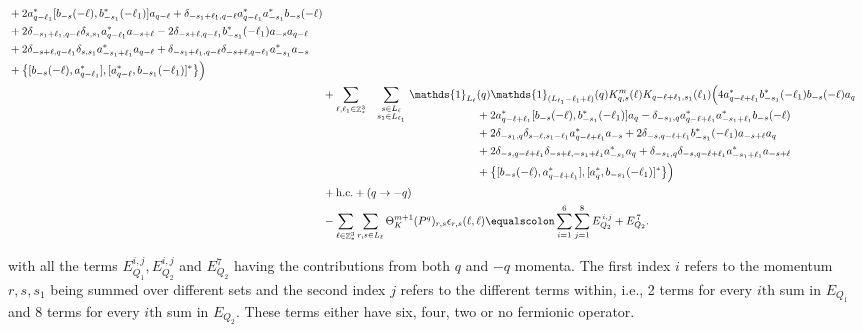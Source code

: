 \documentclass[sn-mathphys, Numbered ,a4paper]{sn-jnl}%
\DeclareMathOperator{\Z}{\mathbb{Z}}
\theoremstyle{plain}
\theoremstyle{definition}
\theoremstyle{remark}
\theoremstyle{plain}
\theoremstyle{definition}
\theoremstyle{remark}
\begin{document}
\begin{alignat}{2}
\begin{aligned}[t]
		&+ 2a^*_{q-\ell_1}[b_{-s}(-\ell),b^*_{-s_1}(-\ell_1)]a_{q-\ell}+\delta_{-s_1+\ell_1,q-\ell} a^*_{q-\ell_1}a^*_{-s_1}b_{-s}(-\ell)\nonumber\\
		&+ 2\delta_{-s_1+\ell_1,q-\ell}\delta_{s,s_1}a^*_{q-\ell_1}a_{-s+\ell} - 2\delta_{-s+\ell,q-\ell_1}b^*_{-s_1}(-\ell_1)a_{-s}a_{q-\ell} \nonumber\\
		&+2\delta_{-s+\ell,q-\ell_1}\delta_{s,s_1}a^*_{-s_1+\ell_1} a_{q-\ell} + \delta_{-s_1+\ell_1,q-\ell}\delta_{-s+\ell,q-\ell_1}a^*_{-s_1}a_{-s} \nonumber\\
		&+ \big\{ [b_{-s}(-\ell),a^*_{q-\ell_1}],[a^*_{q-\ell}, b_{-s_1}(-\ell_1)]^*\big\} \Big) 
	\end{aligned}\nonumber\\
	&+\sum\limits_{\ell, \ell_1\in \Z^3_*}\!\quad\sum\limits_{\substack{s \in L_{\ell}\\     s_1 \in L_{\ell_1}}} \begin{aligned}[t]\, \mathds{1}_{L_\ell}&       (q) \mathds{1}_{(L_{\ell_1}-\ell_1+\ell)}(q) K^{m}_{q,s}(\ell) K_{q-\ell+\ell_1,s_1}        (\ell_1) \Big(4a^*_{q-\ell+\ell_1}b^*_{-s_1}(-\ell_1)b_{-s}(-\ell)a_{q}       \nonumber\\ 
		&+ 2a^*_{q-\ell+\ell_1}[b_{-s}(-\ell),b^*_{-s_1}(-\ell_1)]a_{q}- \delta_{-s_1, q}a^*_{q-\ell+\ell_1}a^*_{-s_1+\ell_1}b_{-s}(-\ell) \nonumber\\
		&+ 2\delta_{-s_1,q}\delta_{s-\ell,s_1-\ell_1}a^*_{q-\ell+\ell_1}a_{-s} + 2\delta_{-s,q-\ell+\ell_1}b^*_{-s_1}(-\ell_1)a_{-s+\ell}a_{q} \nonumber\\
		&+2\delta_{-s,q-\ell+\ell_1}\delta_{-s+\ell,-s_1+\ell_1}a^*_{-s_1}a_{q} + \delta_{-s_1,q}\delta_{-s,q-\ell+\ell_1}a^*_{-s_1+\ell_1}a_{-s+\ell} \nonumber\\
		&+ \big\{ [b_{-s}(-\ell),a^*_{q-\ell+\ell_1}],[a^*_{q}, b_{-s_1}(-\ell_1)]^*\big\} \Big)
	\end{aligned}\nonumber\\
	&+\mathrm{h.c.} + (q\rightarrow-q)\nonumber\\
	&-\sum\limits_{\ell \in \Z^3_*}\sum\limits_{r,s \in L_{\ell}}\Theta^{m+1}_K(P^q)_{r,s}\epsilon_{r,s}(\ell,\ell)
	\equalscolon \sum\limits_{i=1}^{6}\sum\limits_{j=1}^{8} E_{Q_2}^{\,i,j}\nonumber + E_{Q_2}^{\, 7}.
\end{alignat}

with all the terms $E_{Q_1}^{i,j}, E_{Q_2}^{i,j}$ and $E_{Q_2}^{7}$ having the contributions from both $q$ and $-q$ momenta. The first index $i$ refers to the momentum $r,s,s_1$ being summed over different sets and the second index $j$ refers to the different terms within, i.e., 2 terms for every $i\mathrm{th}$ sum in $E_{Q_1}$ and 8 terms for every $i\mathrm{th}$ sum in $E_{Q_2}$. These terms either have six, four, two or no fermionic operator.
\end{document}
